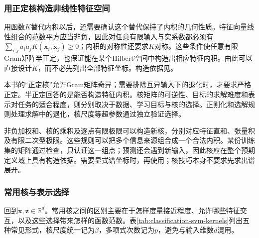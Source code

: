 \subsubsection{用正定核构造非线性特征空间}
\label{sec:classic-overview-kernel-validity}
\label{sec:classification-svm-mercer}

用函数$K$替代内积以后，还需要确认这个替代保持了内积的几何性质。特征向量线性组合的范数平方应当非负，因此对任意有限输入与实系数都必须有$\sum_{i,j}a_i a_jK(\bm x_i,\bm x_j)\geq0$；内积的对称性还要求$K$对称。这些条件使任意有限Gram矩阵半正定，也保证能在某个Hilbert空间中构造出相应特征内积。由此可以直接设计$K$，而不必先列出全部特征坐标。构造依据见。

本书的“正定核”允许Gram矩阵奇异；需要排除互异输入下的退化时，才要求严格正定。半正定回答的是能否构造特征内积。核矩阵的可逆性、目标的求解难度和表示对任务的适合程度，则分别取决于数据、学习目标与核的选择。正则化和选解规则处理求解中的退化，核尺度等超参数通过独立验证选择。

非负加权和、核的乘积及逐点有限极限可以构造新核，分别对应特征直和、张量积及有限二次型极限。这些规则可以把多个信息来源组合成一个合法内积。某份训练集的矩阵通过检查，只认证这一组点；预测还会遇到新输入，因此核应在整个预期定义域上具有构造依据。需要显式谱坐标时，再使用；核技巧本身不要求先求出谱展开。

\subsubsection{常用核与表示选择}
\label{sec:classic-overview-common-kernels}
\label{sec:classification-svm-common-kernels}

回到$\bm{x},\bm{z}\in\mathbb{R}^d$。常用核之间的区别主要在于怎样度量接近程度、允许哪些特征交互，以及这些选择带来怎样的函数范数。表\ref{tab:classification-svm-kernels}列出五种常见形式，核尺度统一记为$\beta$，多项式次数记为$p$，避免与输入维数$d$混用。

